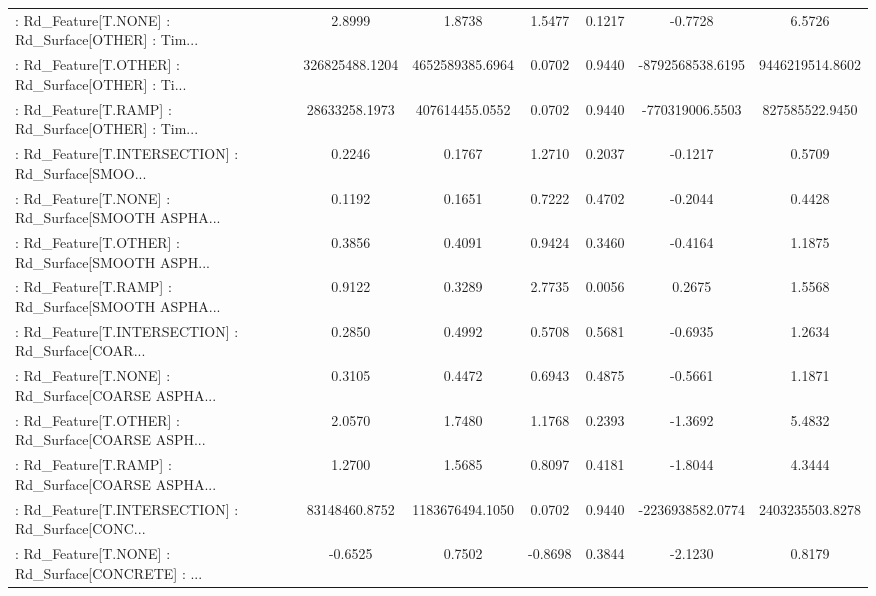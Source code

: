 \begin{longtable}{p{4cm}cccccc}
 : Rd\_Feature[T.NONE] : Rd\_Surface[OTHER] : Tim... &            2.8999 &            1.8738 &  1.5477 &       0.1217 &            -0.7728 &            6.5726 \\
 : Rd\_Feature[T.OTHER] : Rd\_Surface[OTHER] : Ti... &    326825488.1204 &   4652589385.6964 &  0.0702 &       0.9440 &   -8792568538.6195 &   9446219514.8602 \\
 : Rd\_Feature[T.RAMP] : Rd\_Surface[OTHER] : Tim... &     28633258.1973 &    407614455.0552 &  0.0702 &       0.9440 &    -770319006.5503 &    827585522.9450 \\
 : Rd\_Feature[T.INTERSECTION] : Rd\_Surface[SMOO... &            0.2246 &            0.1767 &  1.2710 &       0.2037 &            -0.1217 &            0.5709 \\
 : Rd\_Feature[T.NONE] : Rd\_Surface[SMOOTH ASPHA... &            0.1192 &            0.1651 &  0.7222 &       0.4702 &            -0.2044 &            0.4428 \\
 : Rd\_Feature[T.OTHER] : Rd\_Surface[SMOOTH ASPH... &            0.3856 &            0.4091 &  0.9424 &       0.3460 &            -0.4164 &            1.1875 \\
 : Rd\_Feature[T.RAMP] : Rd\_Surface[SMOOTH ASPHA... &            0.9122 &            0.3289 &  2.7735 &       0.0056 &             0.2675 &            1.5568 \\
 : Rd\_Feature[T.INTERSECTION] : Rd\_Surface[COAR... &            0.2850 &            0.4992 &  0.5708 &       0.5681 &            -0.6935 &            1.2634 \\
 : Rd\_Feature[T.NONE] : Rd\_Surface[COARSE ASPHA... &            0.3105 &            0.4472 &  0.6943 &       0.4875 &            -0.5661 &            1.1871 \\
 : Rd\_Feature[T.OTHER] : Rd\_Surface[COARSE ASPH... &            2.0570 &            1.7480 &  1.1768 &       0.2393 &            -1.3692 &            5.4832 \\
 : Rd\_Feature[T.RAMP] : Rd\_Surface[COARSE ASPHA... &            1.2700 &            1.5685 &  0.8097 &       0.4181 &            -1.8044 &            4.3444 \\
 : Rd\_Feature[T.INTERSECTION] : Rd\_Surface[CONC... &     83148460.8752 &   1183676494.1050 &  0.0702 &       0.9440 &   -2236938582.0774 &   2403235503.8278 \\
 : Rd\_Feature[T.NONE] : Rd\_Surface[CONCRETE] : ... &           -0.6525 &            0.7502 & -0.8698 &       0.3844 &            -2.1230 &            0.8179 \\

\end{longtable}
